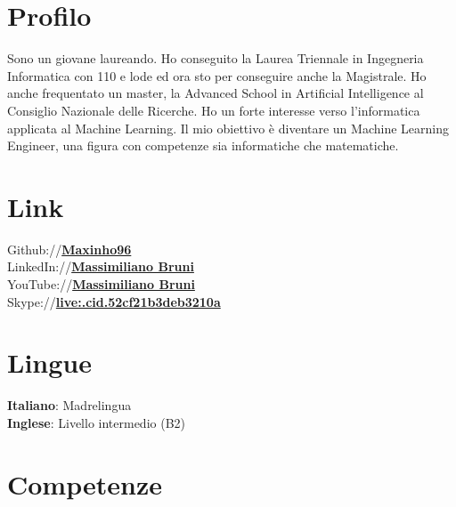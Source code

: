 \documentclass[]{deedy-resume-openfont}
\begin{document}
\begin{minipage}[t]{0.33\textwidth} 


\section{Profilo}
Sono un giovane laureando. Ho conseguito la Laurea Triennale in Ingegneria Informatica con 110 e lode ed ora sto per conseguire anche la Magistrale. Ho anche frequentato un master, la Advanced School in Artificial Intelligence al Consiglio Nazionale delle Ricerche. Ho un forte interesse verso l'informatica applicata al Machine Learning. Il mio obiettivo è diventare un Machine Learning Engineer, una figura con competenze sia informatiche che matematiche.
\sectionsep


\section{Link} 
Github://\href{https://github.com/Maxinho96}{\bf Maxinho96} \\
LinkedIn://\href{https://www.linkedin.com/in/massimiliano-bruni-352926120}{\bf Massimiliano Bruni} \\
YouTube://\href{https://www.youtube.com/channel/UCqskrALDsaUvYC8ztJyqCug}{\bf Massimiliano Bruni} \\
Skype://\href{https://join.skype.com/invite/w9MIsgXZsji7}{\bf live:.cid.52cf21b3deb3210a}
\sectionsep


\section{Lingue}
\textbf{Italiano}: Madrelingua \\
\textbf{Inglese}: Livello intermedio (B2)
\sectionsep


\section{Competenze}


\end{minipage}
\end{document}
